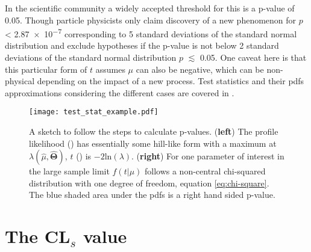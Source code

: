 In the scientific community a widely accepted threshold for this is a p-value of 0.05. Though particle physicists only claim discovery of a new phenomenon for $p$ < \qty{2.87e-7}{} corresponding to 5 standard deviations of the standard normal distribution and exclude hypotheses if the p-value is not below 2 standard deviations of the standard normal distribution $p$ $\lesssim$ \qty{0.05}{}. One caveat here is that this particular form of $t$ assumes $\mu$ can also be negative, which can be non-physical depending on the impact of a new process. Test statistics and their \acp{pdf} approximations considering the different cases are covered in \citep{cowan2011asymptotic}. 
\begin{figure}
    \centering
    \texttt{[image: test\_stat\_example.pdf]}
        \caption[]{A sketch to follow the steps to calculate p-values. (\textbf{left}) The profile likelihood () has essentially some hill-like form with a maximum at ${\lambda(\hat{\mu},\hat{\bm{\Theta}})}$, $t$ () is $-2\mathrm{ln}(\lambda)$. (\textbf{right}) For one parameter of interest in the large sample limit $f(t | \mu)$ follows a non-central chi-squared distribution with one degree of freedom, equation \ref{eq:chi-square}. The blue shaded area under the \acp{pdf} is a right hand sided p-value.}
    \label{fig:test_stat_example}    
\end{figure}

\section{The CL$_s$ value}\label{sec:cls}

